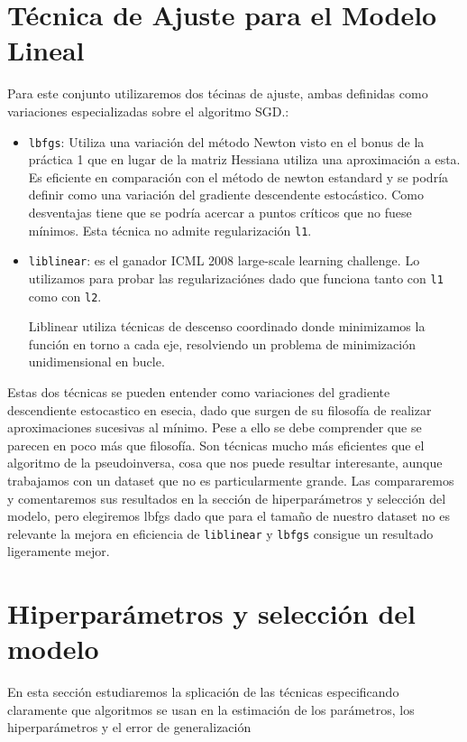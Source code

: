 \documentclass[11pt,a4paper]{article}
\begin{document}
\section{ Técnica de Ajuste para el Modelo Lineal}
Para este conjunto utilizaremos dos técinas de ajuste, ambas definidas como variaciones especializadas sobre el algoritmo SGD.:
\begin{itemize}
	\item \texttt{lbfgs}: Utiliza una variación del método Newton visto en el bonus de la práctica 1 que en lugar de la matriz Hessiana utiliza una aproximación a esta. Es eficiente en comparación con el método de newton estandard y se podría definir como una variación del gradiente descendente estocástico. Como desventajas tiene que se podría acercar a puntos críticos que no fuese mínimos. Esta técnica no admite regularización \texttt{l1}.
	\item \texttt{liblinear}: es el ganador ICML 2008 large-scale learning challenge. Lo utilizamos para probar las regularizaciónes dado que funciona tanto con \texttt{l1} como con \texttt{l2}.
	
	Liblinear utiliza técnicas de descenso coordinado\cite{CD} donde minimizamos la función en torno a cada eje, resolviendo un problema de minimización unidimensional en bucle. 
\end{itemize}

Estas dos técnicas se pueden entender como variaciones del gradiente descendiente estocastico en esecia, dado que surgen de su filosofía de realizar aproximaciones sucesivas al mínimo. Pese a ello se debe comprender que se parecen en poco más que filosofía. Son técnicas mucho más eficientes que el algoritmo de la pseudoinversa, cosa que nos puede resultar interesante, aunque trabajamos con un dataset que no es particularmente grande. Las compararemos y comentaremos sus resultados  en la sección de hiperparámetros y selección del modelo, pero elegiremos lbfgs dado que para el tamaño de nuestro dataset no es relevante la mejora en eficiencia de \texttt{liblinear} y \texttt{lbfgs} consigue un resultado ligeramente mejor.


\section{Hiperparámetros y selección del modelo}
 En esta sección estudiaremos la splicación de las técnicas especificando claramente que algoritmos se usan en la estimación de los parámetros, los hiperparámetros y el error de generalización
 
\end{document}
